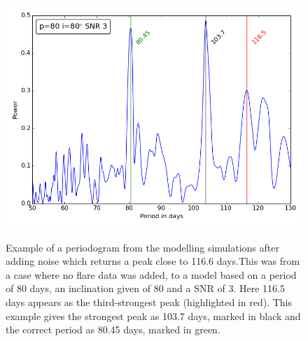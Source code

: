 \begin{figure}[!htbp]
\begin{center}
\includegraphics[scale=0.4]{Figures/badeg.png} \\
\end{center}
\caption{Example of a periodogram from the modelling simulations after adding noise which returns a peak close to 116.6
days.This was from a case where no flare data was added, to a model based on a period of 80 days, an inclination given
of 80{\degree} and a SNR of 3. Here 116.5 days appears as the third-strongest peak (highlighted in red). This example
gives the strongest peak as 103.7 days, marked in black and the correct period as 80.45 days, marked in green.}
\protect\label{fig:rec116}
\end{figure}
